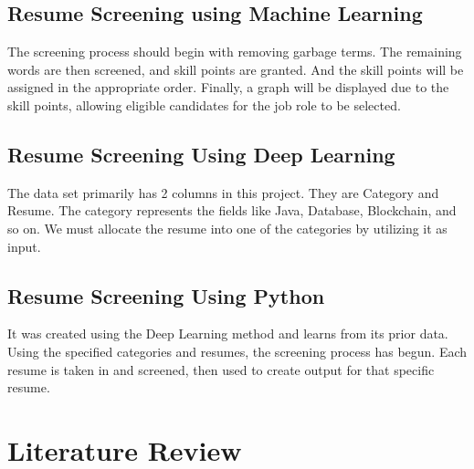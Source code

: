 \documentclass[12 pt, oneside]{book}
\begin{document}
\subsection{Resume Screening using Machine Learning} The screening process should begin with removing garbage terms. The remaining words are then screened, and skill points are granted. And the skill points will be assigned in the appropriate order. Finally, a graph will be displayed due to the skill points, allowing eligible
candidates for the job role to be selected.

\subsection{Resume Screening Using Deep Learning}The data set primarily has 2 columns in this project. They are Category and Resume. The category represents the fields like Java, Database,
Blockchain, and so on. We must allocate the resume into one of the categories by utilizing it as input.

\subsection{Resume Screening Using Python}It was created using the Deep Learning method and learns from its prior data. Using the specified categories and resumes, the screening process has begun. Each resume is taken in and screened, then used to create output for that specific resume. 


\section{Literature Review}
\end{document}
